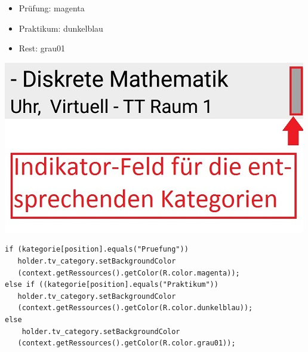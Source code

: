 \begin{description}
\begin{itemize}
\item Prüfung: \textcolor{magentat}{magenta}
\item Praktikum: \textcolor{dunkelblaut}{dunkelblau}
\item Rest: \textcolor{grau01t}{grau01}
\end{itemize}
\includegraphics[scale=0.5]{05_Handbuch/img/kategorie.jpg}
\begin{lstlisting}
if (kategorie[position].equals("Pruefung"))
   holder.tv_category.setBackgroundColor
   (context.getRessources().getColor(R.color.magenta));
else if ((kategorie[position].equals("Praktikum"))
   holder.tv_category.setBackgroundColor
   (context.getRessources().getColor(R.color.dunkelblau));
else
    holder.tv_category.setBackgroundColor
   (context.getRessources().getColor(R.color.grau01));

\end{lstlisting}
\end{description} 